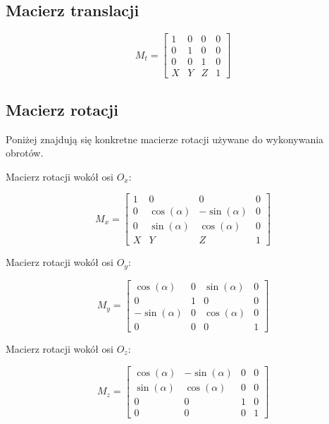 \documentclass{article}
\begin{document}
\subsection{Macierz translacji}
\begin{equation}
M_{t} = \begin{bmatrix}
       1 & 0 & 0 & 0 \\[0.3em]
       0 & 1 & 0 & 0 \\[0.3em]
       0 & 0 & 1 & 0 \\[0.3em]
       X & Y & Z & 1
     \end{bmatrix}
\end{equation}

\subsection{Macierz rotacji}
Poniżej znajdują się konkretne macierze rotacji używane do wykonywania obrotów.
\begin{center}
Macierz rotacji wokół osi $O_{x}$:
\end{center}
\begin{equation}
 M_{x} = \begin{bmatrix}
       1 & 0 & 0 & 0 \\[0.3em]
       0 & \cos(\alpha) & -\sin(\alpha) & 0 \\[0.3em]
       0 & \sin(\alpha) & \cos(\alpha) & 0 \\[0.3em]
       X & Y & Z & 1
     \end{bmatrix}
\end{equation}

\begin{center}
Macierz rotacji wokół osi $O_{y}$:
\end{center}
\begin{equation}
 M_{y} = \begin{bmatrix}
       \cos(\alpha) & 0 & \sin(\alpha) & 0 \\[0.3em]
       0 & 1 & 0 & 0 \\[0.3em]
       -\sin(\alpha) & 0 & \cos(\alpha) & 0 \\[0.3em]
       0 & 0 & 0 & 1
     \end{bmatrix}
\end{equation}

\begin{center}
Macierz rotacji wokół osi $O_{z}$:
\end{center}
\begin{equation}
 M_{z} = \begin{bmatrix}
       \cos(\alpha) & -\sin(\alpha) & 0 & 0 \\[0.3em]
       \sin(\alpha) & \cos(\alpha) & 0 & 0 \\[0.3em]
       0 & 0 & 1 & 0 \\[0.3em]
       0 & 0 & 0 & 1
     \end{bmatrix}
\end{equation}
\end{document}
